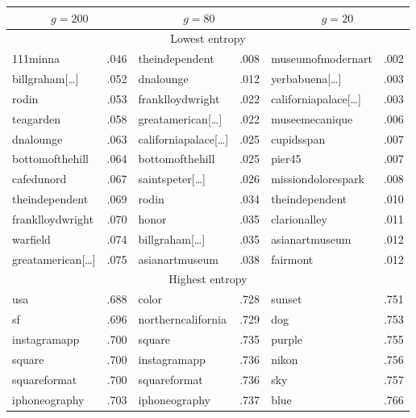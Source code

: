 \begin{table}[ht]
\centering
\setlength{\tabcolsep}{1.2em}
\begin{tabular}{lclclc}
\toprule
 \multicolumn{2}{c}{$g=200$}&  \multicolumn{2}{c}{$g=80$}&  \multicolumn{2}{c}{$g=20$}  \\
\midrule
\multicolumn{6}{c}{Lowest entropy} \\
\midrule
111minna         & .046 & theindependent         & .008 & museumofmodernart   & .002 \\
billgraham[…]    & .052 & dnalounge              & .012 & yerbabuena[…]       & .003 \\
rodin            & .053 & franklloydwright       & .022 & californiapalace[…] & .003 \\
teagarden        & .058 & greatamerican[…]       & .022 & museemecanique      & .006 \\
dnalounge        & .063 & californiapalace[…]    & .025 & cupidsspan          & .007 \\
bottomofthehill  & .064 & bottomofthehill        & .025 & pier45              & .007 \\
cafedunord       & .067 & saintspeter[…]         & .026 & missiondolorespark  & .008 \\
theindependent   & .069 & rodin                  & .034 & theindependent      & .010 \\
franklloydwright & .070 & honor                  & .035 & clarionalley        & .011 \\
warfield         & .074 & billgraham[…]          & .035 & asianartmuseum      & .012 \\
greatamerican[…] & .075 & asianartmuseum         & .038 & fairmont            & .012 \\
\midrule
\multicolumn{6}{c}{Highest entropy} \\
\midrule
usa              & .688 & color                  & .728 & sunset              & .751 \\
sf               & .696 & northerncalifornia     & .729 & dog                 & .753 \\
instagramapp     & .700 & square                 & .735 & purple              & .755 \\
square           & .700 & instagramapp           & .736 & nikon               & .756 \\
squareformat     & .700 & squareformat           & .736 & sky                 & .757 \\
iphoneography    & .703 & iphoneography          & .737 & blue                & .766 \\

\end{tabular}
\end{table}
